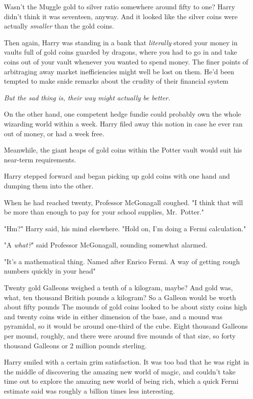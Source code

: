 Wasn't the Muggle gold to silver ratio somewhere around fifty to one? Harry
didn't think it was seventeen, anyway. And it looked like the silver coins were
actually \emph{smaller} than the gold coins.

Then again, Harry was standing in a bank that \emph{literally} stored your
money in vaults full of gold coins guarded by dragons, where you had to go in
and take coins out of your vault whenever you wanted to spend money. The finer
points of arbitraging away market inefficiencies might well be lost on them.
He'd been tempted to make snide remarks about the crudity of their financial
system{\el}

\emph{But the sad thing is, their way might actually be better.}

On the other hand, one competent hedge fundie could probably own the whole
wizarding world within a week. Harry filed away this notion in case he ever ran
out of money, or had a week free.

Meanwhile, the giant heaps of gold coins within the Potter vault would suit
his near-term requirements.

Harry stepped forward and began picking up gold coins with one hand and
dumping them into the other.

When he had reached twenty, Professor McGonagall coughed. "I think that will be
more than enough to pay for your school supplies, Mr.~Potter."

"Hm?" Harry said, his mind elsewhere. "Hold on, I'm doing a Fermi calculation."

"A \emph{what?}" said Professor McGonagall, sounding somewhat alarmed.

"It's a mathematical thing. Named after Enrico Fermi. A way of getting rough
numbers quickly in your head{\el}"

Twenty gold Galleons weighed a tenth of a kilogram, maybe? And gold was, what,
ten thousand British pounds a kilogram? So a Galleon would be worth about fifty
pounds{\el} The mounds of gold coins looked to be about sixty coins high and
twenty coins wide in either dimension of the base, and a mound was pyramidal,
so it would be around one-third of the cube. Eight thousand Galleons per mound,
roughly, and there were around five mounds of that size, so forty thousand
Galleons or 2 million pounds sterling.

Harry smiled with a certain grim satisfaction. It was too bad that he
was right in the middle of discovering the amazing new world of magic, and
couldn't take time out to explore the amazing new world of being rich, which a
quick Fermi estimate said was roughly a billion times less interesting.

